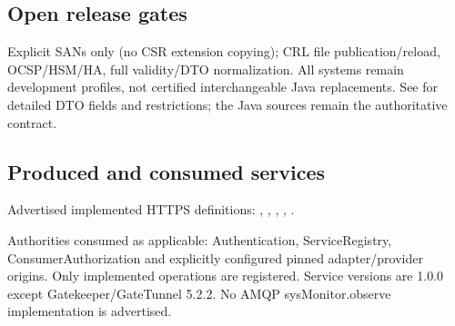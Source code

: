 \documentclass[a4paper]{arrowhead}
\begin{document}
\subsection{Open release gates}
Explicit SANs only (no CSR extension copying); CRL file publication/reload, OCSP/HSM/HA, full validity/DTO normalization. All systems remain development profiles, not certified interchangeable Java replacements. See  for detailed DTO fields and restrictions; the Java sources remain the authoritative contract.
\subsection{Produced and consumed services}
Advertised implemented HTTPS definitions: , \allowbreak {}, \allowbreak {}, \allowbreak {}, \allowbreak {}.\par
Authorities consumed as applicable: Authentication, ServiceRegistry, ConsumerAuthorization and explicitly configured pinned adapter/provider origins. Only implemented operations are registered. Service versions are 1.0.0 except Gatekeeper/GateTunnel 5.2.2. No AMQP sysMonitor.observe implementation is advertised.
\end{document}
